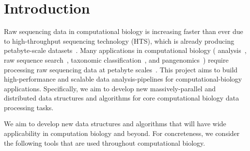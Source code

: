 


\section{Introduction}
\label{intro}





Raw sequencing data in computational biology is increasing faster than ever
due to high-throughput sequencing technology (HTS), which is already producing
petabyte-scale datasets~\cite{kodama2012sequence}. Many applications in computational biology (\kmer
analysis~\cite{MarccaisKi11}, raw sequence search~\cite{solomon2016fast}, taxonomic classification~\cite{wood2014kraken}, and pangenomics~\cite{computational2018computational})
require processing raw sequencing data at petabyte scales~\cite{kodama2012sequence}. This project aims to
build high-performance and scalable data analysis-pipelines for computational-biology applications.
Specifically, we aim to develop new massively-parallel and distributed data structures and algorithms for core computational biology data processing tasks.



We aim to develop new data structures and algorithms that will have wide applicability in computation biology and beyond. For concreteness, we consider the following tools that are used throughout computational biology.

